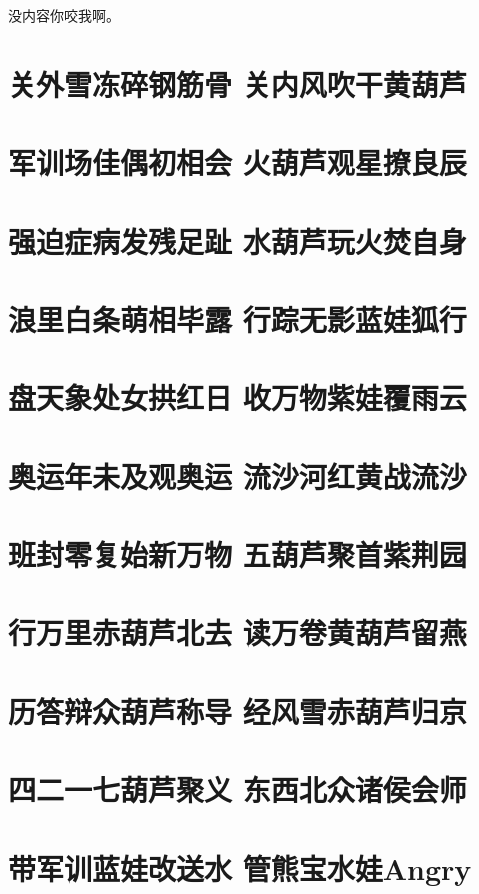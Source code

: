 \documentclass[12pt, a4paper]{book}
\begin{document}
\begin{CJK}{UTF8}{gbsn}
    没内容你咬我啊。
    
    \chapter{关外雪冻碎钢筋骨 关内风吹干黄葫芦}

    \chapter{军训场佳偶初相会 火葫芦观星撩良辰}

    \chapter{强迫症病发残足趾 水葫芦玩火焚自身}

    \chapter{浪里白条萌相毕露 行踪无影蓝娃狐行}

    \chapter{盘天象处女拱红日 收万物紫娃覆雨云}

    \chapter{奥运年未及观奥运 流沙河红黄战流沙}

    \chapter{班封零复始新万物 五葫芦聚首紫荆园}

    \chapter{行万里赤葫芦北去 读万卷黄葫芦留燕}

    \chapter{历答辩众葫芦称导 经风雪赤葫芦归京}

    \chapter{四二一七葫芦聚义 东西北众诸侯会师}

    \chapter{带军训蓝娃改送水 管熊宝水娃Angry}


\end{CJK}
\end{document}
